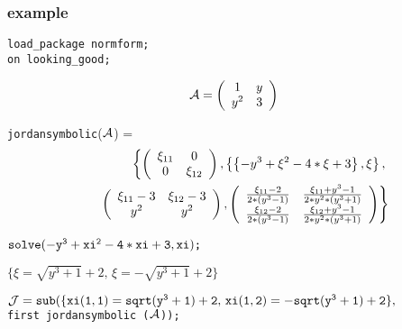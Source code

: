 \subsubsection{example}

{\tt load\_package normform;}\\
{\tt on looking\_good;} 

\begin{displaymath}
{\cal A} = \left( \begin{array}{cc} 1 & y \\ y^2 & 3  \end{array} 
\right)
\end{displaymath}

{\tt jordansymbolic}(${\cal A}$) = 
\begin{eqnarray}
 & & \left\{ \left( \begin{array}{cc} \xi_{11} & 0 \\ 0 & \xi_{12}
\end{array} \right) ,
\left\{ \left\{ -y^3+\xi^2-4*\xi+3 \right\}, \xi \right\}, \right. 
\nonumber \\ & & \hspace{0.1in} \left. \left( \begin{array}{cc} 
\xi_{11} -3 & \xi_{12} -3 \\ y^2 & y^2 
\end{array} \right), \left( \begin{array}{cc} \frac{\xi_{11} -2}
{2*(y^3-1)} & \frac{\xi_{11} + y^3 -1}{2*y^2*(y^3+1)} \\ 
\frac{\xi_{12} -2}{2*(y^3-1)} & \frac{\xi_{12}+y^3-1}{2*y^2*(y^3+1)}
\end{array} \right) \right\} \nonumber
\end{eqnarray}

\vspace{0.2in}
\begin{flushleft}
\begin{math}
{\tt solve(-y^3+xi^2-4*xi+3,xi)}${\tt ;}$
\end{math}
\end{flushleft}

\vspace{0.1in}
\begin{center}
\begin{math}
\{ \xi = \sqrt{y^3+1} + 2,\, \xi = -\sqrt{y^3+1}+2 \}
\end{math}
\end{center}

\vspace{0.1in}
\begin{math}
{\tt {\cal J}  = sub}{\tt (}{\tt \{ xi(1,1)=sqrt(y^3+1)+2,\, xi(1,2) = 
-sqrt(y^3+1)+2\},} 
\end{math}
\\ \hspace*{0.29in} {\tt first  jordansymbolic (${\cal A}$));} 
 
